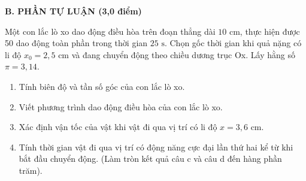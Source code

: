 
\noindent \textbf{B. PHẦN TỰ LUẬN (3,0 điểm)}
\vspace{0.2cm}

\begin{ex}%
	Một con lắc lò xo dao động điều hòa trên đoạn thẳng dài $10\text{ cm}$, thực hiện được 50 dao động toàn phần trong thời gian $25\text{ s}$. Chọn gốc thời gian khi quả nặng có li độ $x_0=2,5\text{ cm}$ và đang chuyển động theo chiều dương trục Ox. Lấy hằng số $\pi=3,14$.
	\begin{enumerate}
		\item[a)] Tính biên độ và tần số góc của con lắc lò xo.
		\item[b)] Viết phương trình dao động điều hòa của con lắc lò xo.
		\item[c)] Xác định vận tốc của vật khi vật đi qua vị trí có li độ $x=3,6\text{ cm}$.
		\item[d)] Tính thời gian vật đi qua vị trí có động năng cực đại lần thứ hai kể từ khi bắt đầu chuyển động. (Làm tròn kết quả câu c và câu d đến hàng phần trăm).
	\end{enumerate}
\end{ex}
